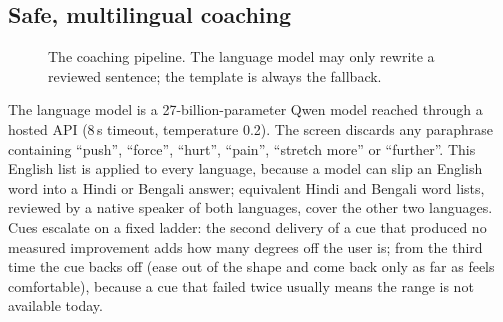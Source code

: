 \documentclass[11pt,a4paper]{article}
\begin{document}
\subsection{Safe, multilingual coaching}
\begin{figure}[ht]
\centering
{}
\caption{The coaching pipeline. The language model may only rewrite a reviewed sentence; the template is always the fallback.}
\end{figure}
The language model is a 27-billion-parameter Qwen model reached through a hosted API (8\,s timeout, temperature 0.2). The screen discards any paraphrase containing ``push'', ``force'', ``hurt'', ``pain'', ``stretch more'' or ``further''. This English list is applied to every language, because a model can slip an English word into a Hindi or Bengali answer; equivalent Hindi and Bengali word lists, reviewed by a native speaker of both languages, cover the other two languages. Cues escalate on a fixed ladder: the second delivery of a cue that produced no measured improvement adds how many degrees off the user is; from the third time the cue backs off (ease out of the shape and come back only as far as feels comfortable), because a cue that failed twice usually means the range is not available today.

\FloatBarrier
\end{document}
